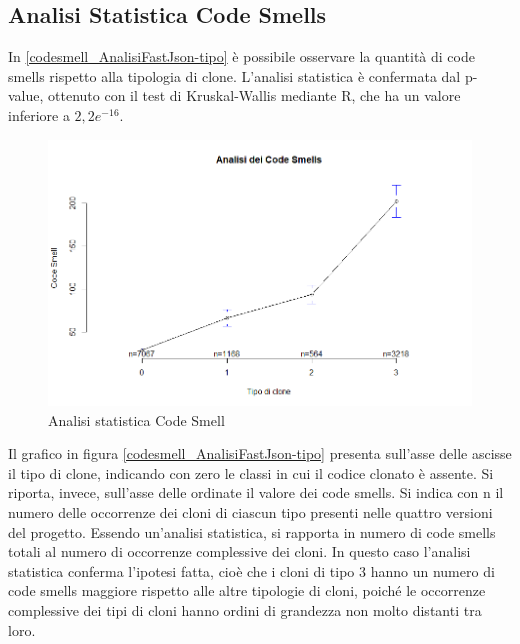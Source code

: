 \subsection{Analisi Statistica Code Smells}
In \autoref{codesmell_AnalisiFastJson-tipo} è possibile osservare la quantità di code smells rispetto alla tipologia di clone. L'analisi statistica è confermata dal p-value, ottenuto con il test di Kruskal-Wallis mediante R, che ha un valore inferiore a $2,2 e^{-16}$. \newpage
\begin{figure}[htbp]
	\centering
	\includegraphics[scale=0.5]{analisi_R/AnalisiFastJson/2-gplot-codesmell-type.png}
\caption{Analisi statistica Code Smell}
\label{codesmell_AnalisiFastJson-tipo}
\end{figure}
Il grafico in figura \autoref{codesmell_AnalisiFastJson-tipo} presenta sull'asse delle ascisse il tipo di clone, indicando con zero le classi in cui il codice clonato è assente. Si riporta, invece, sull'asse delle ordinate il valore dei code smells. Si indica con n il numero delle occorrenze dei cloni di ciascun tipo presenti nelle quattro versioni del progetto. Essendo un'analisi statistica, si rapporta in numero di code smells totali al numero di occorrenze complessive dei cloni. In questo caso l'analisi statistica conferma l'ipotesi fatta, cioè che i cloni di tipo 3 hanno un numero di code smells maggiore rispetto alle altre tipologie di cloni, poiché le occorrenze complessive dei tipi di cloni hanno ordini di grandezza non molto distanti tra loro.

